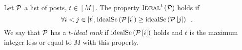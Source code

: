 \begin{definition}
  Let $\mathcal{P}$ a list of posts, $t \in [M]$. The property
  $\textsc{Ideal}^{t}\left(\mathcal{P}\right)$ holds if
  \begin{equation*}
    \forall i < j \in [t], \mathrm{idealSc}\left(\mathcal{P}\left[i\right]\right) \geq
    \mathrm{idealSc}\left(\mathcal{P}\left[j\right]\right) \enspace.
  \end{equation*}
  We say that $\mathcal{P}$ has a $t$-\emph{ideal rank} if
  $\mathrm{idealSc}\left(\mathcal{P}\left[i\right]\right)$ holds and $t$ is the maximum integer less or
  equal to $M$ with this property.

\end{definition}
